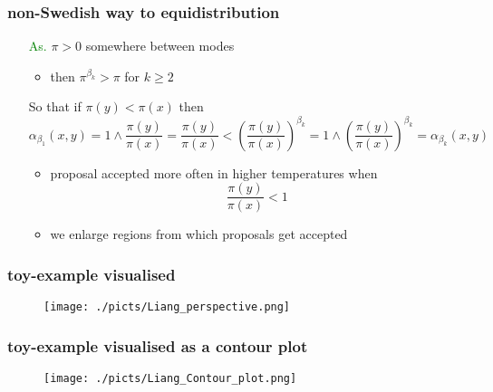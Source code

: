 
\begin{frame}
		\frametitle{ non-Swedish way to equidistribution }
	
	\begin{itemize}
			
		\item[\textcolor{green}{As.}] $ \pi > 0$ somewhere between modes 
		
		\begin{itemize}
			\item then $\pi^{\beta_k} > \pi$ for $k \geq 2$
		\end{itemize}
		
		\item[] So that if $\pi(y) < \pi(x)$ then  
 $$\alpha_{\beta_1}(x,y) = 1 \wedge \frac{\pi(y)}{\pi(x)} = \frac{\pi(y)}{\pi(x)} <  (\frac{\pi(y)}{\pi(x)})^{\beta_k} = 1 \wedge (\frac{\pi(y)}{\pi(x)})^{\beta_k} = \alpha_{\beta_k}(x,y)$$

		\begin{itemize}
			\item proposal accepted more often in higher temperatures when  $$\frac{\pi(y)}{\pi(x)} < 1$$
			\item we enlarge regions from which proposals get accepted
		\end{itemize}

	\end{itemize}	

\end{frame}


\begin{frame}
		\frametitle{toy-example visualised}
	
	\begin{center}
		\begin{figure}\texttt{[image: ./picts/Liang\_perspective.png]}\end{figure}	
	\end{center}	
		
\end{frame}

\begin{frame}
		\frametitle{toy-example visualised as a contour plot}
	
	\begin{center}
		\begin{figure}\texttt{[image: ./picts/Liang\_Contour\_plot.png]}\end{figure}	
	\end{center}	
		
\end{frame}

